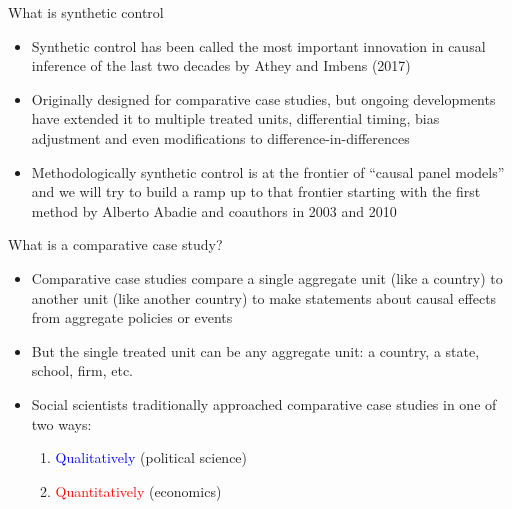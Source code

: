 \documentclass{beamer}
\begin{document}
\begin{frame}{What is synthetic control}
	
	\begin{itemize}
	\item Synthetic control has been called the most important innovation in causal inference of the last two decades by Athey and Imbens (2017)
	\item Originally designed for comparative case studies, but ongoing developments have extended it to multiple treated units, differential timing, bias adjustment and even modifications to difference-in-differences
	\item Methodologically synthetic control is at the frontier of ``causal panel models'' and we will try to build a ramp up to that frontier starting with the first method by Alberto Abadie and coauthors in 2003 and 2010
	\end{itemize}
\end{frame}
	
\begin{frame}{What is a comparative case study?}

\begin{itemize}
\item Comparative case studies compare a single aggregate unit (like a country) to another unit (like another country) to make statements about causal effects from aggregate policies or events
\item But the single treated unit can be any aggregate unit: a country, a state, school, firm, etc. 
\item Social scientists traditionally approached comparative case studies in one of two ways:
	\begin{enumerate}
	\item \textcolor{blue}{Qualitatively} (political science)
	\item \textcolor{red}{Quantitatively} (economics)
	\end{enumerate}
\end{itemize}

\end{frame}
\end{document}
